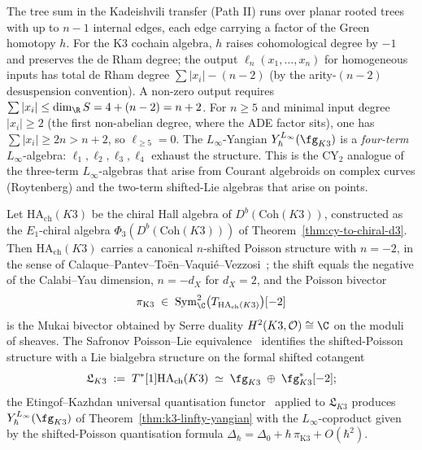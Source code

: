 \begin{remark}
\label{rem:k3-linfty-quaternary-closure}
The tree sum in the Kadeishvili transfer (Path II) runs over planar
rooted trees with up to $n - 1$ internal edges, each edge carrying a
factor of the Green homotopy $h$. For the K$3$ cochain algebra, $h$
raises cohomological degree by $-1$ and preserves the de Rham degree;
the output $\ell_n(x_1, \dots, x_n)$ for homogeneous inputs has total
de Rham degree $\sum |x_i| - (n - 2)$ (by the arity-$(n - 2)$
desuspension convention). A non-zero output requires
$\sum |x_i| \leq \dim_\R S = 4 + (n - 2) = n + 2$. For $n \geq 5$
and minimal input degree $|x_i| \geq 2$ (the first non-abelian degree,
where the ADE factor sits), one has $\sum |x_i| \geq 2n > n + 2$, so
$\ell_{\geq 5} = 0$. The $L_\infty$-Yangian $Y_\hbar^{L_\infty}
(\fg_{K3})$ is a \emph{four-term} $L_\infty$-algebra:
$\ell_1, \ell_2, \ell_3, \ell_4$ exhaust the structure. This is the
CY$_2$ analogue of the three-term $L_\infty$-algebras that arise
from Courant algebroids on complex curves (Roytenberg) and the
two-term shifted-Lie algebras that arise on points.
\end{remark}

\begin{theorem}
\label{thm:k3-shifted-poisson-bialgebra}
Let $\mathrm{HA}_{\mathrm{ch}}(K3)$ be the chiral Hall algebra of
$D^b(\mathrm{Coh}(K3))$, constructed as the $E_1$-chiral algebra
$\Phi_3(D^b(\mathrm{Coh}(K3)))$ of
Theorem~\ref{thm:cy-to-chiral-d3}. Then
$\mathrm{HA}_{\mathrm{ch}}(K3)$ carries a canonical $n$-shifted
Poisson structure with $n = -2$, in the sense of
Calaque--Pantev--To\"en--Vaqui\'e--Vezzosi~\cite{CPTVV2017}; the shift
equals the negative of the Calabi--Yau dimension, $n = -d_X$ for
$d_X = 2$, and the Poisson bivector
\[
 \pi_{\mathrm{K3}}
 \;\in\; \mathrm{Sym}^2_\C\bigl(T_{\mathrm{HA}_{\mathrm{ch}}(K3)}\bigr)[-2]
\]
is the Mukai bivector obtained by Serre duality
$H^2(K3, \mathcal{O}) \cong \C$ on the moduli of sheaves. The
Safronov Poisson--Lie equivalence~\cite{Safronov2017} identifies
the shifted-Poisson structure with a Lie bialgebra structure on the
formal shifted cotangent
\[
 \mathfrak{L}_{K3}
 \;:=\; T^*[1]\mathrm{HA}_{\mathrm{ch}}(K3)
 \;\simeq\; \fg_{K3} \;\oplus\; \fg_{K3}^*[-2];
\]
the Etingof--Kazhdan universal quantisation
functor~\cite{EtingofKazhdan1996} applied to $\mathfrak{L}_{K3}$
produces $Y_\hbar^{L_\infty}(\fg_{K3})$ of
Theorem~\ref{thm:k3-linfty-yangian} with the $L_\infty$-coproduct
given by the shifted-Poisson quantisation formula
$\Delta_\hbar = \Delta_0 + \hbar\,\pi_{\mathrm{K3}} + O(\hbar^2)$.
\end{theorem}

